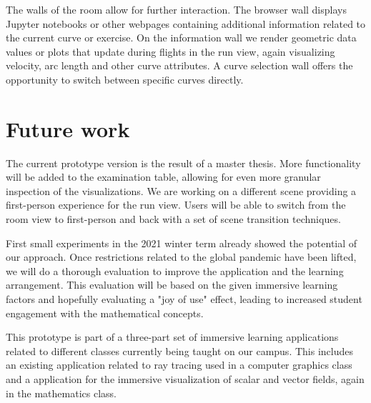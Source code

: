 \documentclass{VRARWorkshop}
\begin{document}
The walls of the room allow for further interaction. The browser wall displays Jupyter notebooks or other webpages
containing additional information related to the current curve or exercise.
On the information wall we render geometric data values or plots that update during flights in the run view, again visualizing velocity, arc length and other curve attributes. %
A curve selection wall offers the opportunity to switch between specific curves directly.

\section{Future work}

The current prototype version is the result of a master thesis.
More functionality will be added to the examination table, allowing for even more granular inspection of the visualizations.
We are working on a different scene providing a first-person experience for the run view.
Users will be able to switch from the room view to first-person and back with a set of
scene transition techniques.

First small experiments in the 2021 winter term already showed the potential of our approach.
Once restrictions related to the global pandemic have been lifted, we will do a thorough evaluation
to improve the application and the learning arrangement.
This evaluation will be based on the given immersive learning factors and
hopefully evaluating a "joy of use" effect, leading to increased student engagement with the mathematical concepts.

This prototype is part of a three-part set of immersive learning applications related to different classes currently being taught on our campus. 
This includes an existing application related to ray tracing used in a computer graphics class and a application for the immersive visualization of scalar and vector fields, again in the mathematics class. 

\VRARsetbibstyle

\end{document}
